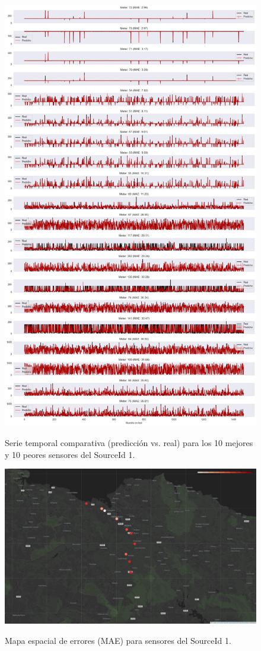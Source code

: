 \begin{figure}[H]
	\centering
	\caption{Serie temporal comparativa (predicción vs. real) para los 10 mejores y 10 peores sensores del SourceId 1.}
	\includegraphics[width=0.75\linewidth]{includes/cap5/graphs/advanced/sid1_10best_10worst_meter_time_series.png}
	\label{fig:sid1_timeseries_best_worst}
\end{figure}

\begin{figure}[H]
	\centering
	\caption{Mapa espacial de errores (MAE) para sensores del SourceId 1.}
	\includegraphics[width=0.9\linewidth]{includes/cap5/graphs/advanced/sid1_meters_error_rate_map.png}
	\label{fig:sid1_error_map}
\end{figure}

